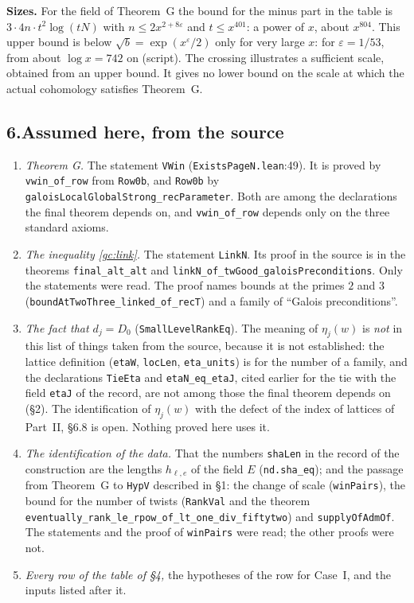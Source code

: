 \documentclass[11pt,letterpaper]{article}
\begin{document}
\textbf{Sizes.} For the field of Theorem~G the bound for the minus part in the table is
$3\cdot4n\cdot t^2\log(tN)$ with $n\le2x^{2+8\varepsilon}$ and $t\le x^{401}$: a power of $x$, about
$x^{804}$. This upper bound is below $\sqrt b=\exp(x^{\varepsilon}/2)$ only for very large $x$: for
$\varepsilon=1/53$, from about $\log x=742$ on (script). The crossing illustrates a sufficient scale, obtained
from an upper bound. It gives no lower bound on the scale at which the actual cohomology satisfies
Theorem~G.

\subsection*{6.\quad Assumed here, from the source}

\begin{enumerate}[label=\textup{(\roman*)},leftmargin=2.4em]
\item \emph{Theorem G.} The statement \texttt{VWin} (\texttt{ExistsPageN.lean}:49). It is proved by
\texttt{vwin\_of\_row} from \texttt{Row0b}, and \texttt{Row0b} by
\texttt{galoisLocalGlobalStrong\_}\allowbreak\texttt{recParameter}. Both are among the declarations the
final theorem depends on, and \texttt{vwin\_of\_row} depends only on the three standard axioms.
\item \emph{The inequality \eqref{gc:link}.} The statement \texttt{LinkN}. Its proof in the source is in
the theorems \texttt{final\_alt\_alt} and \texttt{linkN\_of\_twGood\_}\allowbreak\texttt{galoisPreconditions}. Only
the statements were read. The proof names bounds at the primes $2$ and $3$
(\texttt{boundAtTwoThree\_}\allowbreak\texttt{linked\_of\_recT}) and a family of ``Galois preconditions''.
\item \emph{The fact that $d_j=D_0$} (\texttt{SmallLevelRankEq}). The meaning of $\eta_j(w)$ is \emph{not}
in this list of things taken from the source, because it is not established: the lattice definition
(\texttt{etaW}, \texttt{locLen}, \texttt{eta\_units}) is for the number of a family, and the declarations
\texttt{TieEta} and \texttt{etaN\_eq\_etaJ}, cited earlier for the tie with the field \texttt{etaJ} of the
record, are not among those the final theorem depends on (\S2). The identification of $\eta_j(w)$ with the
defect of the index of lattices of Part~II, \S6.8 is open. Nothing proved here uses it.
\item \emph{The identification of the data.} That the numbers \texttt{shaLen} in the record of the
construction are
the lengths $h_{\ell,e}$ of the field $E$ (\texttt{nd.sha\_eq}); and the passage from Theorem~G to
\texttt{HypV} described in \S1: the change of scale (\texttt{winPairs}), the bound for the number of twists
(\texttt{RankVal} and the theorem
\texttt{eventually\_rank\_le\_}\allowbreak\texttt{rpow\_of\_lt\_one\_div\_fiftytwo}) and
\texttt{supplyOfAdmOf}. The statements and the proof of \texttt{winPairs} were read; the other proofs were not.
\item \emph{Every row of the table of \S4,} the hypotheses of the row for Case~I, and the inputs listed
after it.
\end{enumerate}
\end{document}
